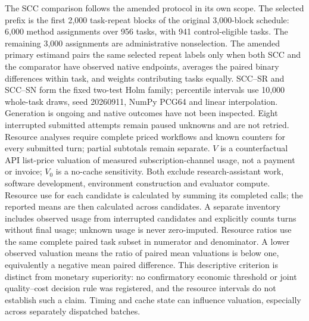 The SCC comparison follows the amended protocol in its own scope. The selected prefix is the first 2,000 task-repeat blocks of the original 3,000-block schedule: 6,000 method assignments over 956 tasks, with 941 control-eligible tasks. The remaining 3,000 assignments are administrative nonselection. The amended primary estimand pairs the same selected repeat labels only when both SCC and the comparator have observed native endpoints, averages the paired binary differences within task, and weights contributing tasks equally. SCC--SR and SCC--SN form the fixed two-test Holm family; percentile intervals use 10,000 whole-task draws, seed 20260911, NumPy PCG64 and linear interpolation. Generation is ongoing and native outcomes have not been inspected. Eight interrupted submitted attempts remain paused unknowns and are not retried. Resource analyses require complete priced workflows and known counters for every submitted turn; partial subtotals remain separate.
$V$ is a counterfactual API list-price valuation of measured subscription-channel usage, not a payment or invoice; $V_0$ is a no-cache sensitivity. Both exclude research-assistant work, software development, environment construction and evaluator compute. Resource use for each candidate is calculated by summing its completed calls; the reported means are then calculated across candidates. A separate inventory includes observed usage from interrupted candidates and explicitly counts turns without final usage; unknown usage is never zero-imputed. Resource ratios use the same complete paired task subset in numerator and denominator. A lower observed valuation means the ratio of paired mean valuations is below one, equivalently a negative mean paired difference. This descriptive criterion is distinct from monetary superiority: no confirmatory economic threshold or joint quality--cost decision rule was registered, and the resource intervals do not establish such a claim. Timing and cache state can influence valuation, especially across separately dispatched batches.

